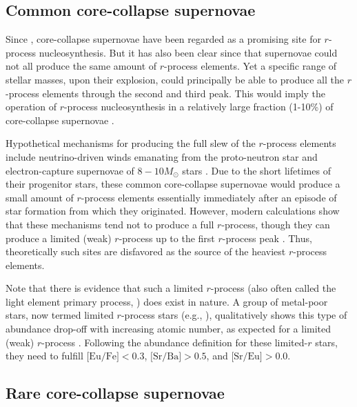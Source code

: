 \documentclass[letterpaper]{article}
\begin{document}
\subsection{Common core-collapse supernovae}

Since \citet{Burbidge57}, core-collapse supernovae have been regarded as a promising site for $r$-process nucleosynthesis.
But it has also been clear since \citet{mcwilliam98} that supernovae could not all produce the same amount of $r$-process elements. Yet a specific range of stellar masses, upon their explosion, could principally be able to produce all the $r$-process elements through the second and third peak. This would imply the operation of $r$-process nucleosynthesis in a relatively large fraction (1-10\%) of core-collapse supernovae \citep[e.g.,][]{wanajo_ishimaru}.

Hypothetical mechanisms for producing the full slew of the $r$-process elements include neutrino-driven winds emanating from the proto-neutron star \citep[e.g.,][]{takahashi94,Woosley92,woosley94,Qian96,Farouqi10} and electron-capture supernovae of $8-10 M_\odot$ stars \citep[e.g.,][]{Ning2007,Janka2008,wanajo_rs2006}.
Due to the short lifetimes of their progenitor stars, these common core-collapse supernovae would produce a small amount of $r$-process elements essentially immediately after an episode of star formation from which they originated.
However, modern calculations show that these mechanisms tend not to produce a full $r$-process, though they can produce a limited (weak) $r$-process up to the first $r$-process peak \citep[e.g.,][]{Arcones07,Arcones11,Wanajo2011}.
Thus, theoretically such sites are disfavored as the source of the heaviest $r$-process elements.

Note that there is evidence that such a limited $r$-process (also often called the light element primary process, \citealt{Travaglio04,Montes07,Hansen12}) does exist in nature. A group of metal-poor stars, now termed limited $r$-process stars (e.g., \citealt{Frebel2018, Hansen2018}), qualitatively shows this type of abundance drop-off with increasing atomic number, as expected for a limited (weak) $r$-process \citep{Honda04,Honda07}. Following the abundance definition for these limited-$r$ stars, they need to fulfill $\mbox{[Eu/Fe]} < 0.3$, $\mbox{[Sr/Ba]} > 0.5$, and  $\mbox{[Sr/Eu]} > 0.0$.


\subsection{Rare core-collapse supernovae}
\end{document}
